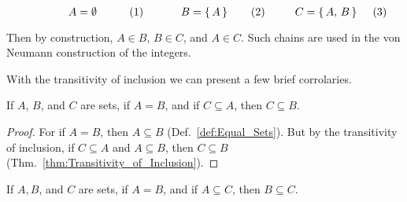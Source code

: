         \begin{subequations}
            \begin{minipage}[b]{0.32\textwidth}
                \centering
                \begin{equation}
                    A=\emptyset
                \end{equation}
            \end{minipage}
            \hfill
            \begin{minipage}[b]{0.32\textwidth}
                \centering
                \begin{equation}
                    B=\{\,A\,\}
                \end{equation}
            \end{minipage}
            \hfill
            \begin{minipage}[b]{0.32\textwidth}
                \centering
                \begin{equation}
                    C=\{\,A,\,B\,\}
                \end{equation}
            \end{minipage}
        \end{subequations}
        \par\vspace{2.5ex}
        Then by construction, $A\in{B}$, $B\in{C}$, and $A\in{C}$. Such chains
        are used in the von Neumann construction of the
        integers.
        \par\hfill\par
        With the transitivity of inclusion we can present a few brief
        corrolaries.
        \begin{theorem}
            \label{thm:Subsets_of_Equal_Sets}%
            If $A$, $B$, and $C$ are sets, if $A=B$, and if $C\subseteq{A}$,
            then $C\subseteq{B}$.
        \end{theorem}
        \begin{proof}
            For if $A=B$, then $A\subseteq{B}$ (Def.~\ref{def:Equal_Sets}). But
            by the transitivity of inclusion, if $C\subseteq{A}$ and
            $A\subseteq{B}$, then $C\subseteq{B}$
            (Thm.~\ref{thm:Transitivity_of_Inclusion}).
        \end{proof}
        \begin{theorem}
            \label{thm:Superset_of_Equal_Sets}%
            If $A,B$, and $C$ are sets, if $A=B$, and if $A\subseteq{C}$, then
            $B\subseteq{C}$.
        \end{theorem}
